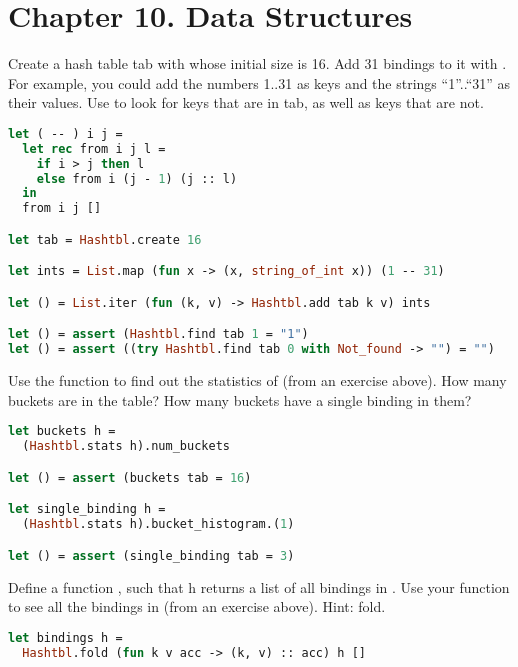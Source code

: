 \section*{Chapter 10. Data Structures}

Create a hash table tab with  whose initial size is 16. Add 31 bindings to it with .
For example, you could add the numbers 1..31 as keys and the strings ``1''..``31'' as their values. Use 
to look for keys that are in tab, as well as keys that are not.

\begin{lstlisting}[language=OCaml]
let ( -- ) i j =
  let rec from i j l =
    if i > j then l
    else from i (j - 1) (j :: l)
  in
  from i j []

let tab = Hashtbl.create 16

let ints = List.map (fun x -> (x, string_of_int x)) (1 -- 31)

let () = List.iter (fun (k, v) -> Hashtbl.add tab k v) ints

let () = assert (Hashtbl.find tab 1 = "1")
let () = assert ((try Hashtbl.find tab 0 with Not_found -> "") = "")   
\end{lstlisting}

Use the  function to find out the statistics of  (from an exercise above). How many buckets are
in the table? How many buckets have a single binding in them?

\begin{lstlisting}[language=OCaml]
let buckets h =
  (Hashtbl.stats h).num_buckets

let () = assert (buckets tab = 16)

let single_binding h =
  (Hashtbl.stats h).bucket_histogram.(1)

let () = assert (single_binding tab = 3)
\end{lstlisting}

Define a function , such that  h returns
a list of all bindings in . Use your function to see all the bindings in  (from an exercise above). Hint: fold.

\begin{lstlisting}[language=OCaml]
let bindings h =
  Hashtbl.fold (fun k v acc -> (k, v) :: acc) h []
\end{lstlisting}


